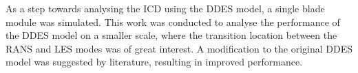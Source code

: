 As a step towards analysing the ICD using the DDES model, a single blade module was simulated. This work was conducted to analyse the performance of the DDES model on a smaller scale, where the transition location between the RANS and LES modes was of great interest. A modification to the original DDES model was suggested by literature, resulting in improved performance.



